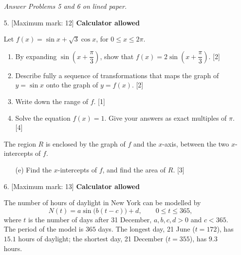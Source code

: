 \documentclass[12pt, twoside]{article}
\begin{document}
\begin{enumerate}[itemsep=0.15cm]
\newpage

\emph{Answer Problems 5 and 6 on lined paper.}

\item[5.] [Maximum mark: 12] \hfill \textbf{Calculator allowed}

Let $f(x) = \sin x + \sqrt{3}\cos x$, for $0 \le x \le 2\pi$.

\begin{enumerate}[itemsep=0.15cm]
  \item By expanding $\sin\left(x + \dfrac{\pi}{3}\right)$, show that
  $f(x) = 2\sin\left(x + \dfrac{\pi}{3}\right)$. \hfill [2]
  \item Describe fully a sequence of transformations that maps the graph of
  $y = \sin x$ onto the graph of $y = f(x)$. \hfill [2]
  \item Write down the range of $f$. \hfill [1]
  \item Solve the equation $f(x) = 1$. Give your answers as exact multiples
  of $\pi$. \hfill [4]
\end{enumerate}

The region $R$ is enclosed by the graph of $f$ and the $x$-axis, between the
two $x$-intercepts of $f$.

\begin{enumerate}[itemsep=0.15cm]
  \item[(e)] Find the $x$-intercepts of $f$, and find the area of $R$.
  \hfill [3]
\end{enumerate}

\newpage

\item[6.] [Maximum mark: 13] \hfill \textbf{Calculator allowed}

The number of hours of daylight in New York can be modelled by
\[
  N(t) = a\sin\bigl(b(t - c)\bigr) + d, \qquad 0 \le t \le 365,
\]
where $t$ is the number of days after 31 December, $a, b, c, d > 0$ and
$c < 365$. The period of the model is $365$ days. The longest day,
21 June ($t = 172$), has $15.1$ hours of daylight; the shortest day,
21 December ($t = 355$), has $9.3$ hours.


\end{enumerate}
\end{document}
